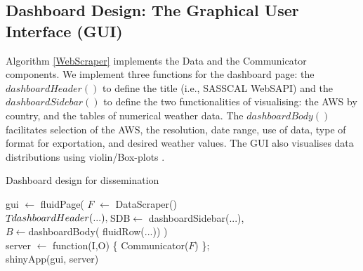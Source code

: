 \documentclass[a4paper, 10pt, conference]{ieeeconf}      %
\begin{document}
\subsection{Dashboard Design: The Graphical User Interface (GUI)} 
\noindent
Algorithm \ref{WebScraper} implements the Data  and the  Communicator components.  We implement three functions for the dashboard page:   the $dashboardHeader()$ to define the title (i.e., SASSCAL WebSAPI) and   the $dashboardSidebar()$ to define the two functionalities of  visualising:  the AWS by country, and   the tables of numerical weather data. The $dashboardBody()$  facilitates selection of the AWS, the  resolution, date range, use of data, type of format for exportation, and  desired weather values.  %
The GUI also visualises data distributions using  violin/Box-plots  \cite{hintze1998violin}.

\begin{algorithm}
	\caption{Dashboard design for dissemination}
	\label{WebScraper}
	{
		gui $\leftarrow$ fluidPage(
			{%
		$F$ $\leftarrow$ DataScraper()   %
	}\\
		$T$\leftarrow$ dashboardHeader(...),\\
		$SDB$\leftarrow$ dashboardSidebar(...),\\
		$B$$\leftarrow$dashboardBody( fluidRow(...))
		)\;\\
		server $\leftarrow$ function(I,O) \{ Communicator($F$) %
		\};\\
		shinyApp(gui, server)\;
}
\end{algorithm}
\end{document}
